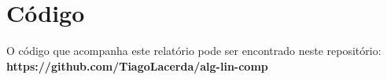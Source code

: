 




% 


\section*{Código}\label{sec:codigo}
O código que acompanha este relatório pode ser encontrado neste repositório:\\ \textbf{https://github.com/TiagoLacerda/alg-lin-comp}



